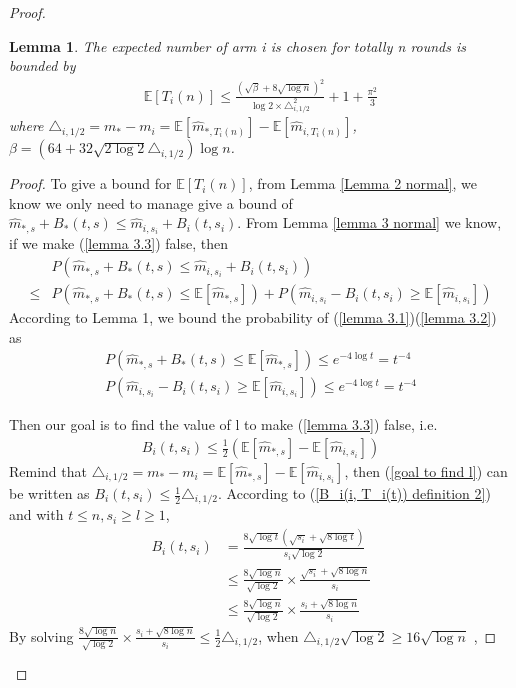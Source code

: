 \documentclass{article}
\theoremstyle{plain}
\newtheorem{lemma}{Lemma}
\begin{document}
\begin{proof}
\begin{lemma}
\label{Lemma 4: bound for E[T_i(n)]}
    The expected number of arm i is chosen for totally n rounds is bounded by 
    \begin{align}
        \mathbb{E}[T_i(n)] \leq  \frac{(\sqrt{\beta} + 8 \sqrt{\log n})^2}{\log 2 \times \triangle_{i, 1/2}^2} + 1 + \frac{\pi^2}{3}
    \end{align}
    where $\triangle_{i, 1/2} = m_\ast - m_i = \mathbb{E}[\hat{m}_{\ast, T_i(n)}] - \mathbb{E}[\hat{m}_{i,T_i(n)}]$, $\beta = (64 + 32 \sqrt{2 \log 2} \triangle_{i,1/2} )\log n$.
\end{lemma}

\begin{proof}
To give a bound for $\mathbb{E}[T_i(n)]$, from Lemma \ref{Lemma 2 normal}, we know we only need to manage give a bound of $\hat{m}_{*, s} + B_*(t, s)  \leq \hat{m}_{i, s_i} + B_i(t, s_i)$. From Lemma \ref{lemma 3 normal} we know, if we make (\ref{lemma 3.3}) false, then 
\begin{align}
    & P(\hat{m}_{*, s} + B_*(t, s)  \leq \hat{m}_{i, s_i} + B_i(t, s_i)) \\
    \leq &  P(\hat{m}_{*, s} + B_*(t, s) \leq  \mathbb{E}[\hat{m}_{*, s}]) + P(\hat{m}_{i, s_i} - B_i(t, s_i) \geq \mathbb{E}[\hat{m}_{i, s_i}])
\end{align}
According to Lemma 1, we bound the probability of (\ref{lemma 3.1})(\ref{lemma 3.2}) as
    \begin{align}
        P(\hat{m}_{*, s} + B_*(t, s) \leq  \mathbb{E}[\hat{m}_{*, s}]) \leq  e^{-4\log t} = t^{-4}\\
        P(\hat{m}_{i, s_i} - B_i(t, s_i) \geq \mathbb{E}[\hat{m}_{i, s_i}])  \leq  e^{-4\log t} = t^{-4}
    \end{align}
    
    Then our goal is to find the value of l to make (\ref{lemma 3.3}) false, i.e. 
    \begin{align}
    \label{goal to find l}
        B_i(t, s_i) \leq  \frac{1}{2}(\mathbb{E}[\hat{m}_{*, s}] - \mathbb{E}[\hat{m}_{i, s_i}])
    \end{align}
    Remind that $\triangle_{i, 1/2} = m_* - m_i = \mathbb{E}[\hat{m}_{*, s}] - \mathbb{E}[\hat{m}_{i, s_i}]$, then (\ref{goal to find l}) can be written as $B_i(t, s_i) \leq  \frac{1}{2} \triangle_{i, 1/2}$. According to (\ref{B_i(i, T_i(t)) definition 2}) and with $t \leq n, s_i \geq l \geq 1$, 
    \begin{align}
        B_i(t, s_i) &= \frac{8 \sqrt{\log t} (\sqrt{ s_i} + \sqrt{8\log t})}{s_i  \sqrt{\log 2}}\\
        & \leq \frac{8 \sqrt{\log n}}{\sqrt{\log 2}} \times \frac{\sqrt{s_i} + \sqrt{8\log n}}{s_i}\\
        & \leq \frac{8 \sqrt{\log n}}{\sqrt{\log 2}} \times \frac{s_i + \sqrt{8\log n}}{s_i}
    \end{align}
    By solving $\frac{8 \sqrt{\log n}}{\sqrt{\log 2}} \times \frac{s_i + \sqrt{8\log n}}{s_i} \leq \frac{1}{2} \triangle_{i, 1/2}$, when $\triangle_{i, 1/2} \sqrt{\log 2} \geq 16 \sqrt{\log n}$ , 
    

\end{proof}
\end{proof}
\end{document}
